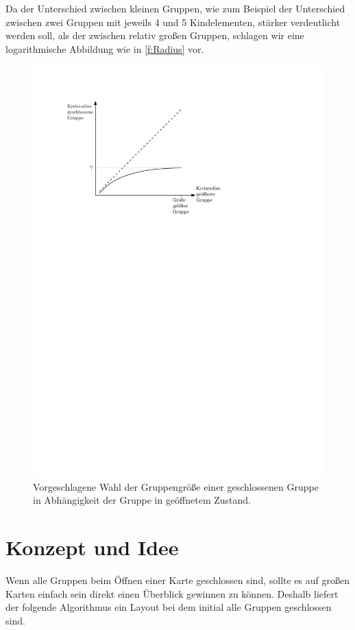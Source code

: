 Da der Unterschied zwischen kleinen Gruppen, wie zum Beispiel der Unterschied zwischen zwei Gruppen mit jeweils 4 und 5 Kindelementen, stärker verdeutlicht werden soll, als der zwischen 
relativ großen Gruppen, schlagen wir eine logarithmische Abbildung wie in \autoref{f:Radius} vor.
\begin{figure}%
\begin{center} 
\includegraphics{Pics/Radius.pdf}
  \caption{Vorgeschlagene Wahl der Gruppengröße einer geschlossenen Gruppe in Abhängigkeit der Gruppe in geöffnetem Zustand. }
  \label{f:Radius}
\end{center}
\end{figure}


\section{Konzept und Idee}
\label{sec:Algo}
Wenn alle Gruppen beim Öffnen einer Karte geschlossen sind, sollte es auf großen Karten einfach sein direkt einen Überblick gewinnen zu können.
Deshalb liefert der folgende Algorithmus ein Layout bei dem initial alle Gruppen geschlossen sind.

